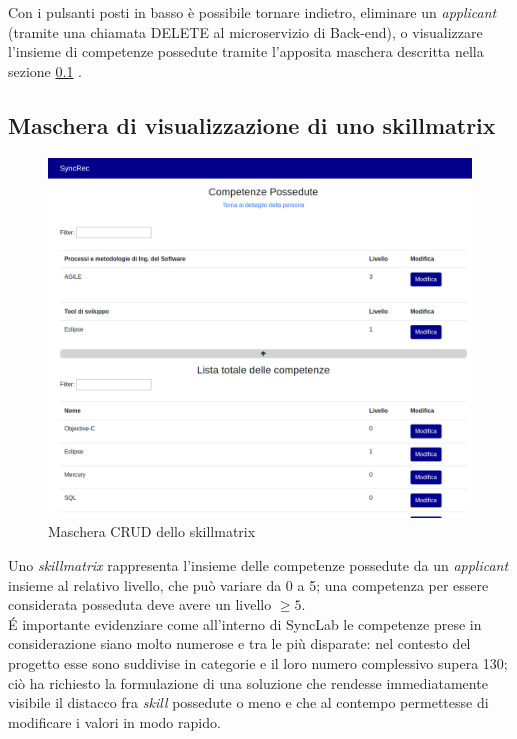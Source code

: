 Con i pulsanti posti in basso è possibile tornare indietro, eliminare un \textit{applicant} (tramite una chiamata DELETE al microservizio di \gls{Back-end}), o visualizzare l'insieme di competenze possedute tramite l'apposita maschera descritta nella sezione \ref{section:skillmatrix}
\vspace{0.5em}.

\subsection{Maschera di visualizzazione di uno skillmatrix}\label{section:skillmatrix}
\begin{figure}[!h] 
	\centering 
	\includegraphics[width=1\columnwidth]{immagini/svil/skillmatrix} 
	\caption{Maschera CRUD dello skillmatrix}
	\label{figura:skillmatrix}
\end{figure}
Uno \textit{skillmatrix} rappresenta l'insieme delle competenze possedute da un \textit{applicant} insieme al relativo livello, che può variare da 0 a 5; una competenza per essere considerata posseduta deve avere un livello $\geq  5$.\\
\'E importante evidenziare come all'interno di SyncLab le competenze prese in considerazione siano molto numerose e tra le più disparate: nel contesto del progetto esse sono suddivise in categorie e il loro numero complessivo supera 130; ciò ha richiesto la formulazione di una soluzione che rendesse immediatamente visibile il distacco fra \textit{skill} possedute o meno e che al contempo  permettesse di modificare i valori in modo rapido.\\
